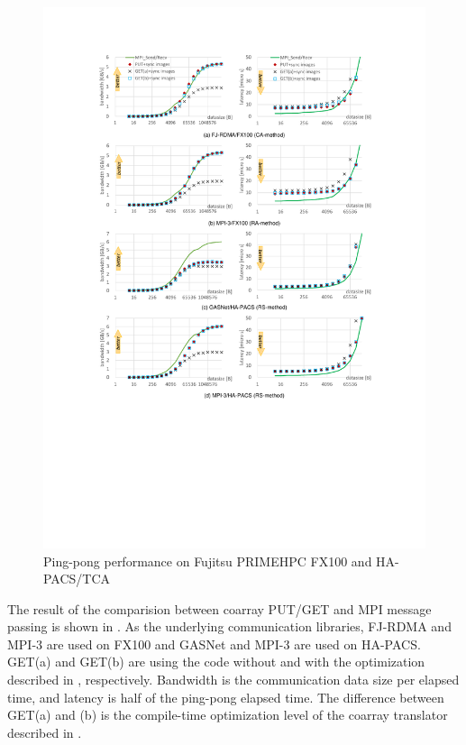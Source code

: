 
\begin{figure}
  \begin{center}
    \mbox{\includegraphics[trim=30mm 80mm 30mm 25mm, scale=0.8, clip]{graphs/8graphs-7.pdf}}
    \caption{Ping-pong performance on Fujitsu PRIMEHPC FX100 and HA-PACS/TCA}\label{fig:8graphs}
  \end{center}
\end{figure}

The result of the comparision between coarray PUT/GET and MPI message passing is shown in
.
As the underlying communication libraries, 
FJ-RDMA and MPI-3 are used on FX100 and GASNet and MPI-3 are used on HA-PACS.
GET(a) and GET(b) are using the code without and with the optimization described in
, respectively.
Bandwidth is the communication data size per elapsed time, and
latency is half of the ping-pong elapsed time.
The difference between GET(a) and (b) is the compile-time optimization level of the 
coarray translator described in .

